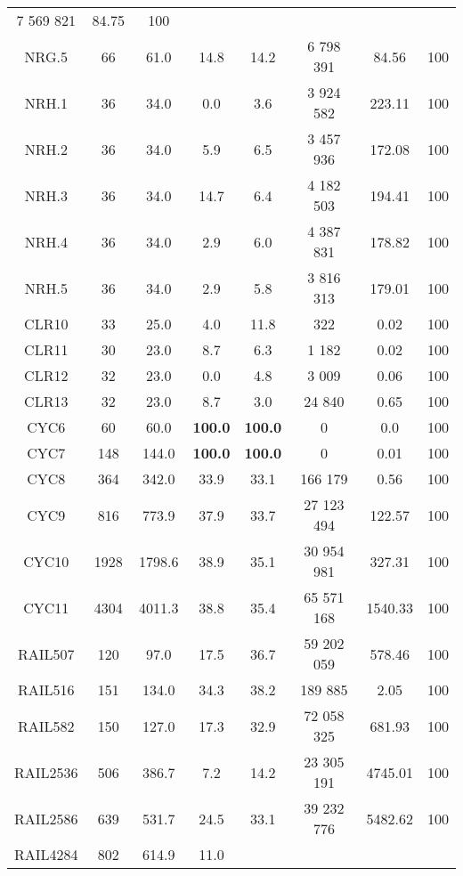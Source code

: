 \begin{longtable}{@{\extracolsep{5pt}}cccccccc}
	7 569 821
	&
	84.75
	&
	100
	\\
	NRG.5
	&
	66
	&
	61.0
	&
	14.8
	&
	14.2
	&
	6 798 391
	&
	84.56
	&
	100
	\\
	NRH.1
	&
	36
	&
	34.0
	&
	0.0
	&
	3.6
	&
	3 924 582
	&
	223.11
	&
	100
	\\
	NRH.2
	&
	36
	&
	34.0
	&
	5.9
	&
	6.5
	&
	3 457 936
	&
	172.08
	&
	100
	\\
	NRH.3
	&
	36
	&
	34.0
	&
	14.7
	&
	6.4
	&
	4 182 503
	&
	194.41
	&
	100
	\\
	NRH.4
	&
	36
	&
	34.0
	&
	2.9
	&
	6.0
	&
	4 387 831
	&
	178.82
	&
	100
	\\
	NRH.5
	&
	36
	&
	34.0
	&
	2.9
	&
	5.8
	&
	3 816 313
	&
	179.01
	&
	100
	\\
	CLR10
	&
	33
	&
	25.0
	&
	4.0
	&
	11.8
	&
	322
	&
	0.02
	&
	100
	\\
	CLR11
	&
	30
	&
	23.0
	&
	8.7
	&
	6.3
	&
	1 182
	&
	0.02
	&
	100
	\\
	CLR12
	&
	32
	&
	23.0
	&
	0.0
	&
	4.8
	&
	3 009
	&
	0.06
	&
	100
	\\
	CLR13
	&
	32
	&
	23.0
	&
	8.7
	&
	3.0
	&
	24 840
	&
	0.65
	&
	100
	\\
	CYC6
	&
	60
	&
	60.0
	&
	\textbf{100.0}
	&
	\textbf{100.0}
	&
	0
	&
	0.0
	&
	100
	\\
	CYC7
	&
	148
	&
	144.0
	&
	\textbf{100.0}
	&
	\textbf{100.0}
	&
	0
	&
	0.01
	&
	100
	\\
	CYC8
	&
	364
	&
	342.0
	&
	33.9
	&
	33.1
	&
	166 179
	&
	0.56
	&
	100
	\\
	CYC9
	&
	816
	&
	773.9
	&
	37.9
	&
	33.7
	&
	27 123 494
	&
	122.57
	&
	100
	\\
	CYC10
	&
	1928
	&
	1798.6
	&
	38.9
	&
	35.1
	&
	30 954 981
	&
	327.31
	&
	100
	\\
	CYC11
	&
	4304
	&
	4011.3
	&
	38.8
	&
	35.4
	&
	65 571 168
	&
	1540.33
	&
	100
	\\
	RAIL507
	&
	120
	&
	97.0
	&
	17.5
	&
	36.7
	&
	59 202 059
	&
	578.46
	&
	100
	\\
	RAIL516
	&
	151
	&
	134.0
	&
	34.3
	&
	38.2
	&
	189 885
	&
	2.05
	&
	100
	\\
	RAIL582
	&
	150
	&
	127.0
	&
	17.3
	&
	32.9
	&
	72 058 325
	&
	681.93
	&
	100
	\\
	RAIL2536
	&
	506
	&
	386.7
	&
	7.2
	&
	14.2
	&
	23 305 191
	&
	4745.01
	&
	100
	\\
	RAIL2586
	&
	639
	&
	531.7
	&
	24.5
	&
	33.1
	&
	39 232 776
	&
	5482.62
	&
	100
	\\
	RAIL4284
	&
	802
	&
	614.9
	&
	11.0
	&

\end{longtable}

